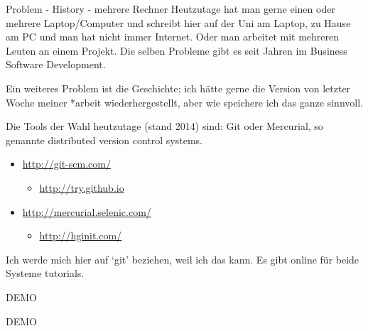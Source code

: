\documentclass{beamer}
\begin{document}
\begin{frame}{Problem - History - mehrere Rechner}
    Heutzutage hat man gerne einen oder mehrere Laptop/Computer und schreibt
    hier auf der Uni am Laptop, zu Hause am PC und man hat nicht immer Internet.
    Oder man arbeitet mit mehreren Leuten an einem Projekt. Die selben Probleme
    gibt es seit Jahren im Business Software Development.

    Ein weiteres Problem ist die Geschichte; ich hätte gerne die Version von
    letzter Woche meiner *arbeit wiederhergestellt, aber wie speichere ich das
    ganze sinnvoll.
\end{frame}
\begin{frame}{Die Tools der Wahl heutzutage (stand 2014) sind:}
    Git oder Mercurial, so genannte distributed version control systems.
    \begin{itemize}
        \item \url{http://git-scm.com/}
        \begin{itemize}
            \item \url{http://try.github.io}
        \end{itemize}
        \item \url{http://mercurial.selenic.com/}
        \begin{itemize}
            \item \url{http://hginit.com/}
        \end{itemize}
    \end{itemize}
    Ich werde mich hier auf ‘git’ beziehen, weil ich das kann. Es gibt online
    für beide Systeme tutorials.
\end{frame}

\begin{frame}[fragile]{DEMO}
    \begin{center}
        \Huge DEMO
    \end{center}
\end{frame}
\end{document}
